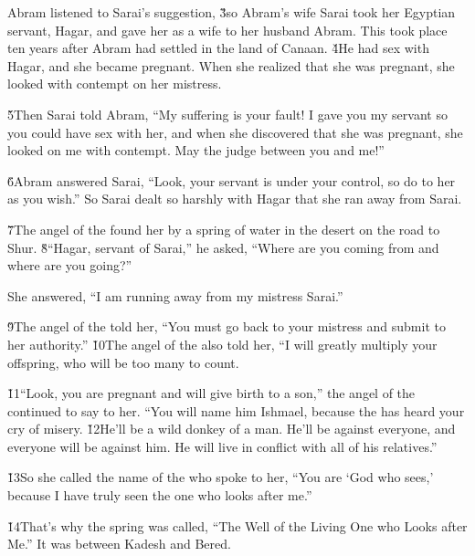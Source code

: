 Abram listened to Sarai's suggestion, \v{3}so Abram's wife Sarai took her Egyptian servant, Hagar, and gave her as a wife to her husband Abram. This took place ten years after Abram had settled in the land of Canaan. \v{4}He had sex with Hagar, and she became pregnant. When she realized that she was pregnant, she looked with contempt on her mistress.

\v{5}Then Sarai told Abram, ``My suffering is your fault! I gave you my servant so you could have sex with her, and when she discovered that she was pregnant, she looked on me with contempt. May the  judge between you and me!''

\v{6}Abram answered Sarai, ``Look, your servant is under your control, so do to her as you wish.'' So Sarai dealt so harshly with Hagar that she ran away from Sarai.

\v{7}The angel of the  found her by a spring of water in the desert on the road to Shur. \v{8}``Hagar, servant of Sarai,'' he asked, ``Where are you coming from and where are you going?''

She answered, ``I am running away from my mistress Sarai.''

\v{9}The angel of the  told her, ``You must go back to your mistress and submit to her authority.'' \v{10}The angel of the  also told her, ``I will greatly multiply your offspring, who will be too many to count.

\v{11}``Look, you are pregnant and will give birth to a son,'' the angel of the  continued to say to her. ``You will name him Ishmael, because the  has heard your cry of misery. \v{12}He'll be a wild donkey of a man. He'll be against everyone, and everyone will be against him. He will live in conflict with all of his relatives.''

\v{13}So she called the name of the  who spoke to her, ``You are `God who sees,' because I have truly seen the one who looks after me.''

\v{14}That's why the spring was called, ``The Well of the Living One who Looks after Me.'' It was between Kadesh and Bered.

